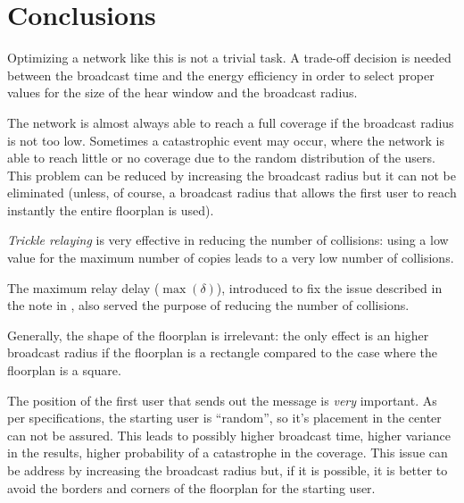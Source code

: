 \chapter{Conclusions}\label{ch:conclusions}

Optimizing a network like this is not a trivial task. A trade-off decision is
needed between the broadcast time and the energy efficiency in order to select
proper values for the size of the hear window and the broadcast radius.

The network is almost always able to reach a full coverage if the broadcast
radius is not too low. Sometimes a catastrophic event may occur, where the
network is able to reach little or no coverage due to the random distribution of
the users. This problem can be reduced by increasing the broadcast radius but it
can not be eliminated (unless, of course, a broadcast radius that allows the
first user to reach instantly the entire floorplan is used).

\emph{Trickle relaying} is very effective in reducing the number of collisions:
using a low value for the maximum number of copies leads to a very low number of
collisions.

The maximum relay delay (\(\max(\delta)\)), introduced to fix the issue
described in the note in , also served the purpose of reducing
the number of collisions.

Generally, the shape of the floorplan is irrelevant: the only effect is an
higher broadcast radius if the floorplan is a rectangle compared to the case
where the floorplan is a square.

The position of the first user that sends out the message is \emph{very}
important. As per specifications, the starting user is ``random'', so it's
placement in the center can not be assured. This leads to possibly higher
broadcast time, higher variance in the results, higher probability of a
catastrophe in the coverage. This issue can be address by increasing the
broadcast radius but, if it is possible, it is better to avoid the borders and
corners of the floorplan for the starting user.
